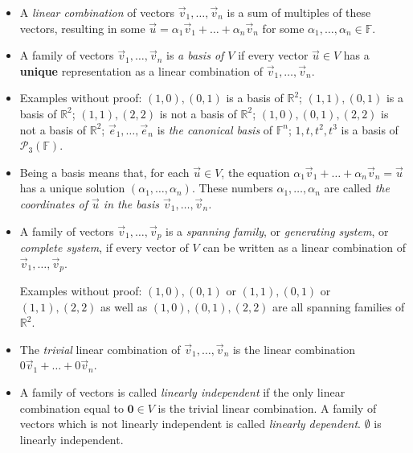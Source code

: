 \documentclass[11pt]{article}
\newcommand{\1}{\mathbf{1}}
\newcommand{\0}{\mathbf{0}}
\newcommand{\F}{\mathbb{F}}
\newcommand{\R}{\mathbb{R}}
\newcommand{\cP}{\mathcal{P}}
\newcommand{\ve}{\vec{e}}
\newcommand{\vu}{\vec{u}}
\newcommand{\vv}{\vec{v}}
\begin{document}
\begin{itemize}

\item

A \emph{linear combination} of vectors $\vv_1,\dots,\vv_n$ is a sum of multiples of these vectors, resulting in some $\vu = \alpha_1 \vv_1 + \dots + \alpha_n \vv_n$ for some $\alpha_1,\dots,\alpha_n\in \mathbb{F}$.

\item

A family of vectors $\vv_1,\dots,\vv_n$ is \emph{a basis of $V$} if every vector $\vu \in V$ has a \textbf{unique} representation as a linear combination of $\vv_1,\dots,\vv_n$.

\item

Examples without proof:
$(1,0),(0,1)$ is a basis of $\R^2$; $(1,1),(0,1)$ is a basis of $\R^2$; $(1,1),(2,2)$ is not a basis of $\R^2$; $(1,0),(0,1),(2,2)$ is not a basis of $\R^2$;
$\ve_1,\dots,\ve_n$ is \emph{the canonical basis} of $\F^n$;
$1,t,t^2,t^3$ is a basis of $\cP_3(\F)$.

\item

Being a basis means that, for each $\vu \in V$, the equation $\alpha_1 \vv_1 + \dots + \alpha_n \vv_n = \vu$ has a unique solution $(\alpha_1,\dots,\alpha_n)$.
These numbers 
$\alpha_1,\dots,\alpha_n$ are called \emph{the coordinates of $\vu$ in the basis $\vv_1,\dots,\vv_n$.}

\item

A family of vectors $\vv_1,\dots,\vv_p$ is a \emph{spanning family}, or \emph{generating system}, or \emph{complete system}, if every vector of $V$ can be written as a linear combination of $\vv_1,\dots,\vv_p$.

Examples without proof:
$(1,0),(0,1)$ or $(1,1),(0,1)$ or $(1,1),(2,2)$ as well as $(1,0),(0,1),(2,2)$ are all spanning families of $\R^2$.

\item

The \emph{trivial} linear combination of $\vv_1,\dots,\vv_n$ is the linear combination $0 \vv_1 + \dots + 0 \vv_n$.

\item

A family of vectors is called \emph{linearly independent} if the only linear combination equal to $\0 \in V$ is the trivial linear combination.
A family of vectors which is not linearly independent is called \emph{linearly dependent}.
$\emptyset$ is linearly independent.


\end{itemize}
\end{document}
